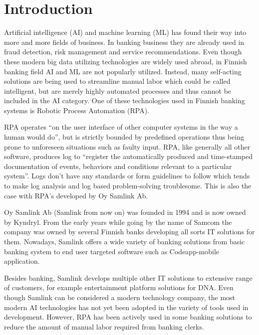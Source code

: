 
\section{Introduction}\label{sec:introduction}

\thispagestyle{empty}
Artificial intelligence (AI) and machine learning (ML)
has found their way into
more and more fields of business.
In banking business they are already used in
fraud detection, risk management and service recommendations.\cite{donepudi2017machine}
Even though these
modern big data utilizing technologies
are widely used abroad,
in Finnish banking field AI and ML are not popularly utilized.
Instead,
many self-acting solutions are being used
to streamline manual labor
which could be called intelligent, %
but are merely highly automated processes
and thus cannot be included in the AI category.
One of these technologies used in Finnish banking systems
is Robotic Process Automation (RPA).

RPA operates \enquote{on the user interface of other computer systems
in the way a human would do},\cite{van2018robotic}
but is strictly bounded by predefined operations
thus being prone to unforeseen situations
such as faulty input.
RPA, like generally all other software,
produces log to \enquote{register
the automatically produced and time-stamped documentation
of events, behaviors and conditions
relevant to a particular system}\cite{delarosa2018log}.
Logs don't have any standards or form guidelines to follow
which tends to make
log analysis and log based problem-solving troublesome.
This is also the case with RPA's developed by Oy Samlink Ab.

Oy Samlink Ab (Samlink from now on)
was founded in 1994
and is now owned by Kyndryl.
From the early years
while going by the name of Samcom
the company was owned by several Finnish banks
developing all sorts IT solutions for them.
Nowadays,
Samlink offers a wide variety of banking solutions
from basic banking system to end user targeted software
such as Codeapp-mobile application.

Besides banking,
Samlink develops multiple other IT solutions
to extensive range of customers,
for example
entertainment platform solutions for DNA\@.
Even though Samlink can be considered
a modern technology company,
the most modern AI technologies has not yet been adopted
in the variety of tools used in development.
However,
RPA has been actively used
in some banking solutions
to reduce the amount of manual labor required
from banking clerks.

